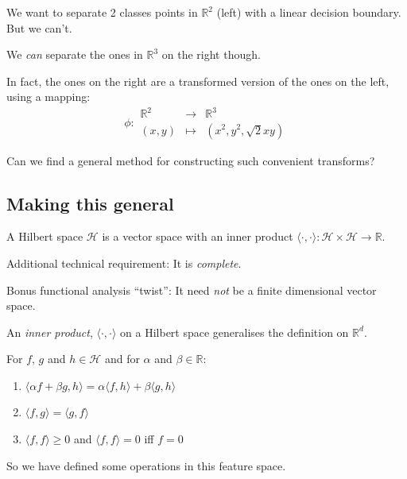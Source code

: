     We want to separate 2 classes points in $\mathbb{R}^2$ (left) with a linear decision boundary. But we can't.
    
    We \emph{can} separate the ones in $\mathbb{R}^3$ on the right though.
 
 \clearpage
In fact, the ones on the right are a transformed version of the ones on the left, using a mapping:
\begin{equation*}
	\phi: \begin{matrix}
		\mathbb{R}^2  &\rightarrow &\mathbb{R}^3\\
		(x,y) &\mapsto &\left(x^2, y^2, \sqrt{2}xy\right)
	\end{matrix}
\end{equation*}

Can we find a general method for constructing such convenient transforms?
\clearpage
\subsection*{Making this general}

\begin{defn}
A Hilbert space $\mathcal{H}$ is a vector space with an inner product $\langle\cdot,\cdot\rangle: \mathcal{H}\times\mathcal{H} \rightarrow\mathbb{R}$.
\end{defn}

Additional technical requirement: It is \emph{complete}.

Bonus functional analysis ``twist'': It need \emph{not} be a finite dimensional vector space.
\clearpage
\begin{defn}
An \emph{inner product}, $\langle\cdot,\cdot\rangle$ on a Hilbert space generalises the definition on $\mathbb{R}^d$.

For $f,\,g$ and $h \in \mathcal{H}$ and for $\alpha$ and $\beta \in \mathbb{R}$:
\begin{enumerate}
\item $\langle\alpha f + \beta g, h\rangle = \alpha\langle f, h\rangle + \beta\langle g, h\rangle$
\item $\langle f, g\rangle = \langle g, f \rangle$
\item $\langle f, f \rangle \ge 0$ and $\langle f, f\rangle = 0$ iff $f =0$
\end{enumerate}
\end{defn}

\clearpage

So we have defined some operations in this feature space.

